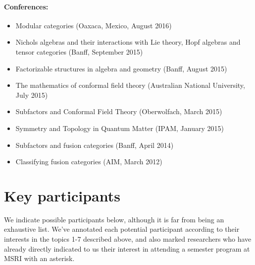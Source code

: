 \documentclass[12pt]{article}
\begin{document}
\paragraph{Conferences:}
\begin{itemize}
  \setlength{\itemsep}{1pt}
  \setlength{\parskip}{0pt}
  \setlength{\parsep}{0pt}
\item Modular categories (Oaxaca, Mexico, August 2016)
\item Nichols algebras and their interactions with Lie theory, Hopf algebras and tensor categories (Banff, September 2015)
\item Factorizable structures in algebra and geometry (Banff, August 2015)
\item The mathematics of conformal field theory (Australian National University, July 2015)
\item Subfactors and Conformal Field Theory (Oberwolfach, March 2015)
\item Symmetry and Topology in Quantum Matter (IPAM, January 2015)
\item Subfactors and fusion categories (Banff, April 2014)
\item Classifying fusion categories (AIM, March 2012)
\end{itemize}

\section{Key participants}
We indicate possible participants below, although it is far from being an exhaustive list. We've annotated each potential participant according to their interests in the topics 1-7 described above, and also marked researchers who have already directly indicated to us their interest in attending a semester program at MSRI with an asterisk.
\end{document}
